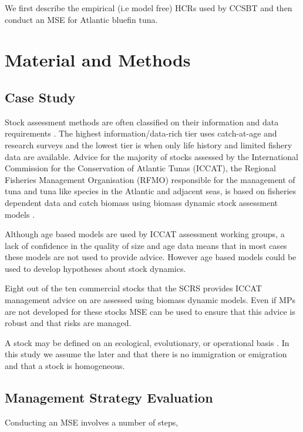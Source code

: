 \documentclass[%
nonumbib,      %
%
]{nrc1}                          %
\begin{document}
We first describe the empirical (i.e model free) HCRs used by CCSBT and then conduct an MSE for Atlantic bluefin
tuna. 	

\section*{Material and Methods}

\subsection*{Case Study}

Stock assessment methods are often classified on their information and data requirements \cite[e.g.][]{smith2005harvest, smith2008experience}. The highest information/data-rich tier uses catch-at-age and research surveys and the lowest tier is when only life history and limited fishery data are available. Advice for the majority of stocks assessed by the International Commission for the Conservation of Atlantic Tunas (ICCAT), the Regional Fisheries Management Organisation (RFMO) responsible for the management of tuna and tuna like species in the Atlantic and adjacent seas, is based on fisheries dependent data and catch biomass using biomass dynamic stock assessment models \cite[e.g.][]{prager1994suite, mcallister2000application}. 

Although age based models are used by ICCAT assessment working groups, a lack of confidence in the quality of size and age data \citep{fromentin2014spectre} means that in most cases these models are not used to provide advice. However age based models could be used to develop hypotheses about stock dynamics. 

Eight out of the ten commercial stocks that the SCRS provides ICCAT management advice on are assessed using biomass dynamic models. Even if MPs are not developed for these stocks MSE can be used to ensure that this advice is robust and that risks are managed.

A stock may be defined on an ecological, evolutionary, or operational basis \citep{waples2006invited}. In this study we assume the later and that there is no immigration or emigration and that a stock is homogeneous.

\subsection*{Management Strategy Evaluation}

Conducting an MSE involves a number of steps, \cite[i.e. after][]{punt2007developing}
\end{document}
